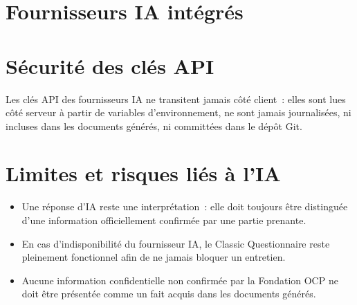 \section{Fournisseurs IA intégrés}

\section{Sécurité des clés API}
Les clés API des fournisseurs IA ne transitent jamais côté client~: elles sont lues
côté serveur à partir de variables d'environnement, ne sont jamais journalisées, ni
incluses dans les documents générés, ni committées dans le dépôt Git.

\section{Limites et risques liés à l'IA}
\begin{itemize}
    \item Une réponse d'IA reste une interprétation~: elle doit toujours être
    distinguée d'une information officiellement confirmée par une partie prenante.
    \item En cas d'indisponibilité du fournisseur IA, le Classic Questionnaire reste
    pleinement fonctionnel afin de ne jamais bloquer un entretien.
    \item Aucune information confidentielle non confirmée par la Fondation OCP ne doit
    être présentée comme un fait acquis dans les documents générés.
\end{itemize}
